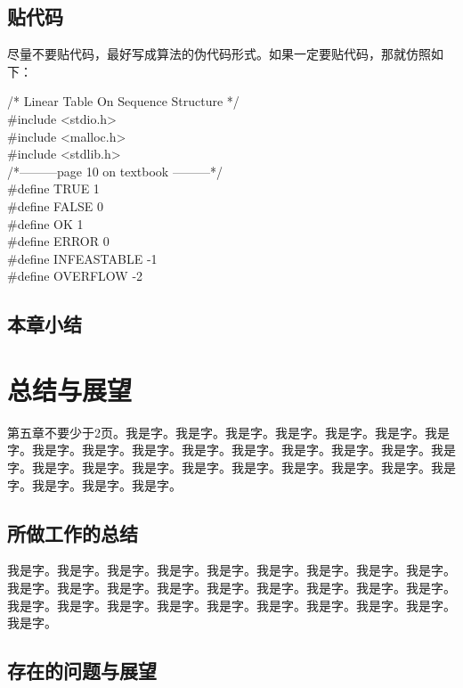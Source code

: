 \documentclass[supercite]{HustGraduPaper}
\theoremstyle{definition}
\begin{document}
\subsection{贴代码}

尽量不要贴代码，最好写成算法的伪代码形式。如果一定要贴代码，那就仿照如下：

\noindent
/* Linear Table On Sequence Structure */\\
\#include <stdio.h>\\
\#include <malloc.h>\\
\#include <stdlib.h>\\

\noindent
/*---------page 10 on textbook ---------*/\\
\#define TRUE 1\\
\#define FALSE 0\\
\#define OK 1\\
\#define ERROR 0\\
\#define INFEASTABLE -1\\
\#define OVERFLOW -2\\

\subsection{本章小结}

\newpage

\section{总结与展望}

第五章不要少于2页。我是字。我是字。我是字。我是字。我是字。我是字。我是字。我是字。我是字。我是字。我是字。我是字。我是字。我是字。我是字。我是字。我是字。我是字。我是字。我是字。我是字。我是字。我是字。我是字。我是字。我是字。我是字。我是字。

\subsection{所做工作的总结}

我是字。我是字。我是字。我是字。我是字。我是字。我是字。我是字。我是字。我是字。我是字。我是字。我是字。我是字。我是字。我是字。我是字。我是字。我是字。我是字。我是字。我是字。我是字。我是字。我是字。我是字。我是字。我是字。

\subsection{存在的问题与展望}
\end{document}
